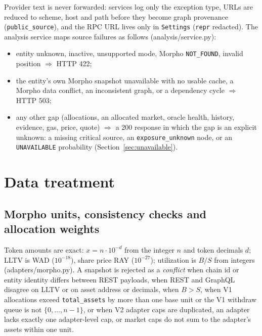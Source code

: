 \documentclass[11pt,a4paper]{article}
\newcommand{\code}[1]{\texttt{#1}}
\newcommand{\src}[1]{\textsf{\small #1}}
\begin{document}
Provider text is never forwarded: services log only the exception type, URLs
are reduced to scheme, host and path before they become graph provenance
(\code{public\_source}), and the RPC URL lives only in \code{Settings}
(\code{repr} redacted). The analysis service maps source failures as follows
(\src{analysis/service.py}):
\begin{itemize}
\item entity unknown, inactive, unsupported mode, Morpho \code{NOT\_FOUND}, invalid
  position $\Rightarrow$ HTTP 422;
\item the entity's own Morpho snapshot unavailable with no usable cache, a Morpho
  data conflict, an inconsistent graph, or a dependency cycle $\Rightarrow$ HTTP 503;
\item any other gap (allocations, an allocated market, oracle health, history,
  evidence, gas, price, quote) $\Rightarrow$ a 200 response in which the gap is an
  explicit unknown: a missing critical source, an \code{exposure\_unknown}
  node, or an \code{UNAVAILABLE} probability (Section~\ref{sec:unavailable}).
\end{itemize}

\section{Data treatment}

\subsection{Morpho units, consistency checks and allocation weights}

Token amounts are exact: $x=n\cdot10^{-d}$ from the integer $n$ and token
decimals $d$; LLTV is WAD ($10^{-18}$), share price RAY ($10^{-27}$);
utilization is $B/S$ from integers (\src{adapters/morpho.py}). A snapshot is
rejected as a \emph{conflict} when chain id or entity identity differs between
REST payloads, when REST and GraphQL disagree on LLTV or on asset address or
decimals, when $B>S$, when V1 allocations exceed \code{total\_assets} by more
than one base unit or the V1 withdraw queue is not $\{0,\dots,n-1\}$, or when V2
adapter caps are duplicated, an adapter lacks exactly one adapter-level cap, or
market caps do not sum to the adapter's assets within one unit.
\end{document}
